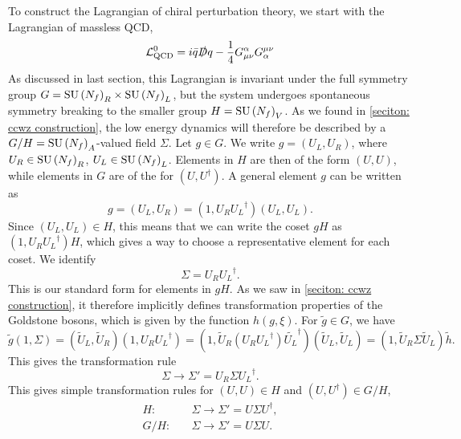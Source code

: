 To construct the Lagrangian of chiral perturbation theory, we start with the Lagrangian of massless QCD,
%
\begin{equation}
    \mathcal{L}^0_\text{QCD} = i \bar q \slashed D q - \frac{1}{4} G^\alpha_{\mu \nu} G_\alpha^{\mu \nu}
\end{equation}
%
As discussed in last section, this Lagrangian is invariant under the full symmetry group $G = \text{SU}\left(N_f\right)_R \times \text{SU}\left(N_f\right)_L$, but the system undergoes spontaneous symmetry breaking to the smaller group $H = \text{SU}\left(N_f\right)_V$.
As we found in \autoref{seciton: ccwz construction}, the low energy dynamics will therefore be described by a $G/H = \text{SU}\left(N_f\right)_A$-valued field $\Sigma$.
Let $g \in G$.
We write $g = (U_L, U_R)$, where $U_R \in \text{SU}\left(N_f\right)_R$, $U_L \in \text{SU}\left(N_f\right)_L$.
Elements in $H$ are then of the form $(U, U)$, while elements in $G$ are of the for $(U, U^\dagger)$.
A general element $g$ can be written as
%
\begin{equation}
    g = (U_L, U_R) = (1, U_R {U_L}^\dagger) (U_L, U_L).
\end{equation}
%
Since $(U_L, U_L) \in H$, this means that we can write the coset $g H$ as $(1, U_R {U_L}^\dagger)H$, which gives a way to choose a representative element for each coset.
We identify
%
\begin{equation}
    \Sigma = U_R {U_L}^\dagger. 
\end{equation}
%
This is our standard form for elements in $gH$.
As we saw in \autoref{seciton: ccwz construction}, it therefore implicitly defines transformation properties of the Goldstone bosons, which is given by the function $h(g, \xi)$.
For $\tilde g \in G$, we have
%
\begin{equation}
    \tilde g (1, \Sigma)
    = (\tilde U_L, \tilde U_R) (1, U_R {U_L}^\dagger)
    = (1, \tilde U_R (U_R {U_L}^\dagger) \tilde {U_L}^\dagger) (\tilde U_L, \tilde U_L)
    = (1, \tilde U_R \Sigma \tilde U_L) \tilde h.
\end{equation}
%
This gives the transformation rule
\begin{equation}
    \Sigma \rightarrow \Sigma' = U_R \Sigma {U_L}^\dagger.
\end{equation}
%
This gives simple transformation rules for $(U, U) \in H$ and $(U, U^\dagger) \in G/H$,
\begin{align}
    \label{sigma transform under H}
    H:& \quad \Sigma \rightarrow \Sigma' = U \Sigma U^\dagger, \\
    \label{sigma transform under G/H}
    G/H:& \quad \Sigma \rightarrow \Sigma' = U \Sigma U.
\end{align}

